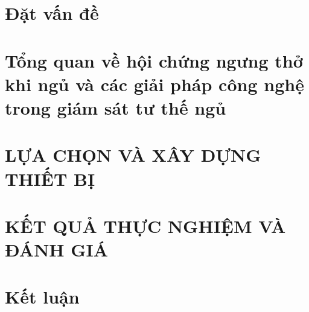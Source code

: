 \documentclass[12pt,a4paper,oneside]{book} %
\renewcommand\thechapter{\arabic{chapter}}
\begin{document}
\renewcommand{\thelstlisting}{\thechapter.\arabic{lstlisting}}

\renewcommand{\thedefinition}{\thechapter.\arabic{definition}}




\pagestyle{plain}
\frontmatter


\tableofcontents


\renewcommand{\listfigurename}{Danh sách hình vẽ}
\renewcommand{\listtablename}{Danh sách bảng}

\listoffigures
{}

\listoftables
{}


\mainmatter


\changefontsizes[16pt]{13pt}
\chapter*{Đặt vấn đề}
\thispagestyle{empty}


\chapter{Tổng quan về hội chứng ngưng thở khi ngủ và các giải pháp công nghệ trong giám sát tư thế ngủ \label{background_section}}


\chapter{LỰA CHỌN VÀ XÂY DỰNG THIẾT BỊ\label{the_proposed_method_section}}


\chapter{KẾT QUẢ THỰC NGHIỆM VÀ ĐÁNH GIÁ}


% 
\chapter{Kết luận}



% 



% 



\newpage
\printbibliography
\end{document}
